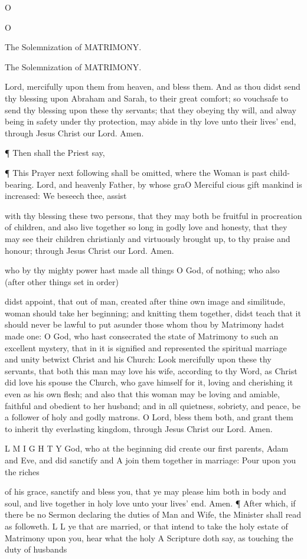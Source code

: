 O

O

The Solemnization of MATRIMONY.

The Solemnization of MATRIMONY.

Lord, mercifully upon them from heaven, and bless them. And as thou didst send thy blessing upon Abraham and Sarah, to their great comfort; so vouchsafe to send thy blessing upon these thy servants; that they obeying thy will, and alway being in safety under thy protection, may abide in thy love unto their lives' end, through Jesus Christ our Lord. Amen.

¶ Then shall the Priest say,

¶ This Prayer next following shall be omitted, where the Woman is past child-bearing. Lord, and heavenly Father, by whose graO Merciful cious gift mankind is increased: We beseech thee, assist

with thy blessing these two persons, that they may both be fruitful in procreation of children, and also live together so long in godly love and honesty, that they may see their children christianly and virtuously brought up, to thy praise and honour; through Jesus Christ our Lord. Amen.

who by thy mighty power hast made all things O God, of nothing; who also (after other things set in order)

didst appoint, that out of man, created after thine own image and similitude, woman should take her beginning; and knitting them together, didst teach that it should never be lawful to put asunder those whom thou by Matrimony hadst made one: O God, who hast consecrated the state of Matrimony to such an excellent mystery, that in it is signified and represented the spiritual marriage and unity betwixt Christ and his Church: Look mercifully upon these thy servants, that both this man may love his wife, according to thy Word, as Christ did love his spouse the Church, who gave himself for it, loving and cherishing it even as his own flesh; and also that this woman may be loving and amiable, faithful and obedient to her husband; and in all quietness, sobriety, and peace, be a follower of holy and godly matrons. O Lord, bless them both, and grant them to inherit thy everlasting kingdom, through Jesus Christ our Lord. Amen.

L M I G H T Y God, who at the beginning did create our first parents, Adam and Eve, and did sanctify and A join them together in marriage: Pour upon you the riches

of his grace, sanctify and bless you, that ye may please him both in body and soul, and live together in holy love unto your lives’ end. Amen. ¶ After which, if there be no Sermon declaring the duties of Man and Wife, the Minister shall read as followeth. L L ye that are married, or that intend to take the holy estate of Matrimony upon you, hear what the holy A Scripture doth say, as touching the duty of husbands

